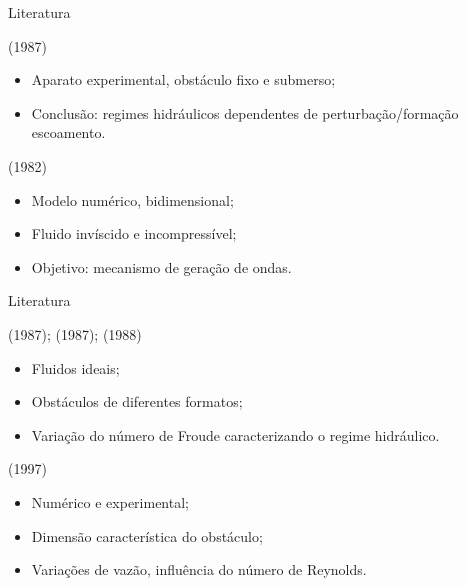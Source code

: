 \begin{frame}{Literatura}
    \begin{exampleblock}{ (1987)}
        \begin{itemize}
            \item Aparato experimental, obstáculo fixo e submerso;
            \item Conclusão: regimes hidráulicos dependentes de perturbação/formação escoamento.
        \end{itemize}
    \end{exampleblock}

    \begin{exampleblock}{ (1982)}
        \begin{itemize}
            \item Modelo numérico, bidimensional;
            \item Fluido invíscido e incompressível;
            \item Objetivo: mecanismo de geração de ondas.
        \end{itemize}
    \end{exampleblock}
\end{frame}

\begin{frame}{Literatura}
    \begin{exampleblock}{ (1987); 
         (1987);  (1988)}
        \begin{itemize}
            \item Fluidos ideais;
            \item Obstáculos de diferentes formatos;
            \item Variação do número de Froude caracterizando o regime hidráulico.
        \end{itemize}
    \end{exampleblock}

    \begin{exampleblock}{ (1997)}
        \begin{itemize}
            \item Numérico e experimental;
            \item Dimensão característica do obstáculo;
            \item Variações de vazão, influência do número de Reynolds.
        \end{itemize}
    \end{exampleblock}
\end{frame}

